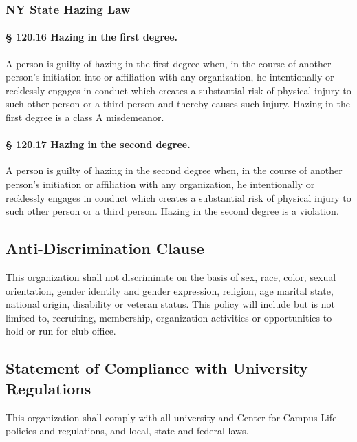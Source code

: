 \documentclass{article}
\newcommand{\asection}[1]{\subsection{#1} \label{#1}}
\newcommand{\asubsection}[1]{\subsubsection{#1} \label{#1}}
\newcommand{\asubsubsection}[1]{\paragraph{#1} \label{#1}}
\begin{document}
\asubsection{NY State Hazing Law}

\asubsubsection{§ 120.16 Hazing in the first degree.}
A person is guilty of hazing in the first degree when, in the course of
another person's initiation into or affiliation with any organization, he intentionally or recklessly engages in
conduct which creates a substantial risk of physical injury to such other person or a third person and thereby
causes such injury.
Hazing in the first degree is a class A misdemeanor.

\asubsubsection{§ 120.17 Hazing in the second degree.}
A person is guilty of hazing in the second degree when, in the course of another person's initiation or affiliation with any organization, he intentionally or recklessly engages in conduct which creates a substantial risk of physical injury to such other person or a third person.
Hazing in the second degree is a violation.

\asection{Anti-Discrimination Clause}
This organization shall not discriminate on the basis of sex, race, color, sexual orientation, gender identity and gender expression, religion, age marital state, national origin, disability or veteran status.
This policy will include but is not limited to, recruiting, membership, organization activities or opportunities to hold or run for club office.

\asection{Statement of Compliance with University Regulations}
This organization shall comply with all university and Center for Campus Life policies and regulations, and local, state and federal laws.
\end{document}
